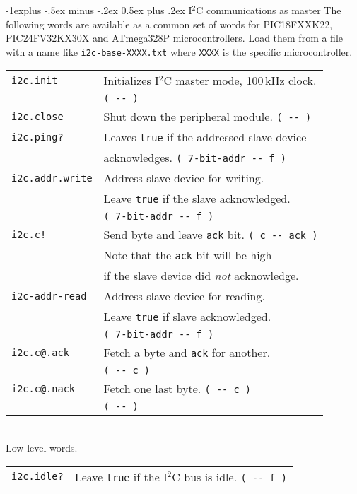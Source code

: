 \documentclass[10pt,landscape,a4paper]{article}
\makeatletter
\renewcommand{\subsection}{\@startsection{subsection}{2}{0mm}%
                                {-1explus -.5ex minus -.2ex}%
                                {0.5ex plus .2ex}%
                                {\normalfont\normalsize\bfseries}}
\makeatother
\begin{document}
\begin{multicols}{3}
\subsection{I$^2$C communications as master}
The following words are available as a common set of words for PIC18FXXK22, 
PIC24FV32KX30X and ATmega328P microcontrollers.
Load them from a file with a name like \verb!i2c-base-XXXX.txt! where \verb!XXXX!
is the specific microcontroller.
\begin{tabular}{@{}ll@{}}
\verb!i2c.init!  & Initializes I$^2$C master mode, 100\,kHz clock. \\
                 & \verb!( -- ) !\\
\verb!i2c.close!  & Shut down the peripheral module. \verb!( -- )! \\ 
\verb!i2c.ping?!  & Leaves \verb!true! if the addressed slave device \\
                  & acknowledges. \verb!( 7-bit-addr -- f )! \\ 
\verb!i2c.addr.write!  & Address slave device for writing. \\
                       & Leave \verb!true! if the slave acknowledged. \\
                       & \verb!( 7-bit-addr -- f )! \\ 
\verb?i2c.c!?  & Send byte and leave \verb!ack! bit. \verb!( c -- ack )! \\
               & Note that the \verb!ack! bit will be high \\
               & if the slave device did \textit{not} acknowledge. \\
\verb!i2c-addr-read!  & Address slave device for reading. \\
                      & Leave \verb!true! if slave acknowledged. \\
                      & \verb!( 7-bit-addr -- f )! \\ 
\verb!i2c.c@.ack!  & Fetch a byte and \verb!ack! for another. \\
                   & \verb!( -- c )! \\ 
\verb!i2c.c@.nack!  & Fetch one last byte. \verb!( -- c )! \\ 
\verb!!  &  \verb!( -- )! \\ 
\end{tabular}\\
Low level words.\\
\begin{tabular}{@{}ll@{}}
\verb!i2c.idle?!  &  Leave \verb!true! if the I$^2$C bus is idle. \verb!( -- f )! \\ 

\end{tabular}
\end{multicols}
\end{document}
